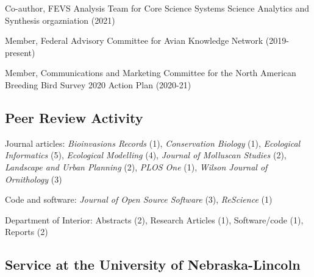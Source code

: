 \documentclass[11pt,]{article}
\providecommand{\tightlist}{%
  \setlength{\itemsep}{0pt}\setlength{\parskip}{0pt}}
\renewenvironment{itemize}{
 \begin{list}{• }{
   \setlength{\leftmargin}{2.5em}
\setlist{before=\setlength{\rightmargin}{\leftmargin}}
   \setlength{\itemsep}{0pt}
 }
}{
 \end{list}
}
\begin{document}
\begin{itemize}
\tightlist
\item
  Co-author, FEVS Analysis Team for Core Science Systems Science
  Analytics and Synthesis orgazniation (2021)
\item
  Member, Federal Advisory Committee for Avian Knowledge Network
  (2019-present)
\item
  Member, Communications and Marketing Committee for the North American
  Breeding Bird Survey 2020 Action Plan (2020-21)
\end{itemize}

\hypertarget{peer-review-activity}{%
\subsection{Peer Review Activity}\label{peer-review-activity}}

\begin{itemize}
\tightlist
\item
  Journal articles: \emph{Bioinvasions Records} (1), \emph{Conservation
  Biology} (1), \emph{Ecological Informatics} (5), \emph{Ecological
  Modelling} (4), \emph{Journal of Molluscan Studies} (2),
  \emph{Landscape and Urban Planning} (2), \emph{PLOS One} (1),
  \emph{Wilson Journal of Ornithology} (3)
\item
  Code and software: \emph{Journal of Open Source Software} (3),
  \emph{ReScience} (1)
\item
  Department of Interior: Abstracts (2), Research Articles (1),
  Software/code (1), Reports (2)
\end{itemize}

\hypertarget{service-at-the-university-of-nebraska-lincoln}{%
\subsection{Service at the University of
Nebraska-Lincoln}\label{service-at-the-university-of-nebraska-lincoln}}
\end{document}
